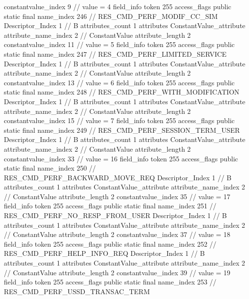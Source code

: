 {{{{{{{					constantvalue_index	9		// value = 4
				}
				}
			}
			field_info {
				token	255
				access_flags	public static final
				name_index	246		// RES_CMD_PERF_MODIF_CC_SIM
				Descriptor_Index	1		// B
				attributes_count	1
				attributes {
				ConstantValue_attribute {
					attribute_name_index	2		// ConstantValue
					attribute_length	2
					constantvalue_index	11		// value = 5
				}
				}
			}
			field_info {
				token	255
				access_flags	public static final
				name_index	247		// RES_CMD_PERF_LIMITED_SERVICE
				Descriptor_Index	1		// B
				attributes_count	1
				attributes {
				ConstantValue_attribute {
					attribute_name_index	2		// ConstantValue
					attribute_length	2
					constantvalue_index	13		// value = 6
				}
				}
			}
			field_info {
				token	255
				access_flags	public static final
				name_index	248		// RES_CMD_PERF_WITH_MODIFICATION
				Descriptor_Index	1		// B
				attributes_count	1
				attributes {
				ConstantValue_attribute {
					attribute_name_index	2		// ConstantValue
					attribute_length	2
					constantvalue_index	15		// value = 7
				}
				}
			}
			field_info {
				token	255
				access_flags	public static final
				name_index	249		// RES_CMD_PERF_SESSION_TERM_USER
				Descriptor_Index	1		// B
				attributes_count	1
				attributes {
				ConstantValue_attribute {
					attribute_name_index	2		// ConstantValue
					attribute_length	2
					constantvalue_index	33		// value = 16
				}
				}
			}
			field_info {
				token	255
				access_flags	public static final
				name_index	250		// RES_CMD_PERF_BACKWARD_MOVE_REQ
				Descriptor_Index	1		// B
				attributes_count	1
				attributes {
				ConstantValue_attribute {
					attribute_name_index	2		// ConstantValue
					attribute_length	2
					constantvalue_index	35		// value = 17
				}
				}
			}
			field_info {
				token	255
				access_flags	public static final
				name_index	251		// RES_CMD_PERF_NO_RESP_FROM_USER
				Descriptor_Index	1		// B
				attributes_count	1
				attributes {
				ConstantValue_attribute {
					attribute_name_index	2		// ConstantValue
					attribute_length	2
					constantvalue_index	37		// value = 18
				}
				}
			}
			field_info {
				token	255
				access_flags	public static final
				name_index	252		// RES_CMD_PERF_HELP_INFO_REQ
				Descriptor_Index	1		// B
				attributes_count	1
				attributes {
				ConstantValue_attribute {
					attribute_name_index	2		// ConstantValue
					attribute_length	2
					constantvalue_index	39		// value = 19
				}
				}
			}
			field_info {
				token	255
				access_flags	public static final
				name_index	253		// RES_CMD_PERF_USSD_TRANSAC_TERM
}}}}}
